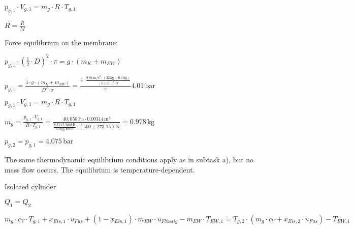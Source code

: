 \( p_{g,1} \cdot V_{g,1} = m_g \cdot R \cdot T_{g,1} \)

\( R = \frac{\bar{R}}{M} \)

Force equilibrium on the membrane:

\( p_{g,1} \cdot \left( \frac{1}{2} \cdot D \right)^2 \cdot \pi = g \cdot (m_K + m_{EW}) \)

\( p_{g,1} = \frac{4 \cdot g \cdot (m_K + m_{EW})}{D^2 \cdot \pi} = \frac{4 \cdot \frac{9.81 \, \text{m/s}^2 \cdot (32 \, \text{kg} + 0.1 \, \text{kg})}{(0.1 \, \text{m})^2 \cdot \pi}} = 4.01 \, \text{bar} \)

\( p_{g,1} \cdot V_{g,1} = m_g \cdot R \cdot T_{g,1} \)

\( m_g = \frac{p_{g,1} \cdot V_{g,1}}{R \cdot T_{g,1}} = \frac{40,050 \, \text{Pa} \cdot 0.00314 \, \text{m}^3}{\frac{8.314 \, \text{J/mol·K}}{50 \, \text{kg/kmol}} \cdot (500 + 273.15) \, \text{K}} = 0.978 \, \text{kg} \)

\( p_{g,2} = p_{g,1} = 4.075 \, \text{bar} \)  

The same thermodynamic equilibrium conditions apply as in subtask a), but no mass flow occurs. The equilibrium is temperature-dependent.  

Isolated cylinder  

\( Q_1 = Q_2 \)  

\( m_g \cdot c_V \cdot T_{g,1} + x_{Eis,1} \cdot u_{Fus} + (1 - x_{Eis,1}) \cdot m_{EW} \cdot u_{Flüssig} - m_{EW} \cdot T_{EW,1} = T_{g,2} \cdot (m_g \cdot c_V + x_{Eis,2} \cdot u_{Fus}) - T_{EW,1} \)